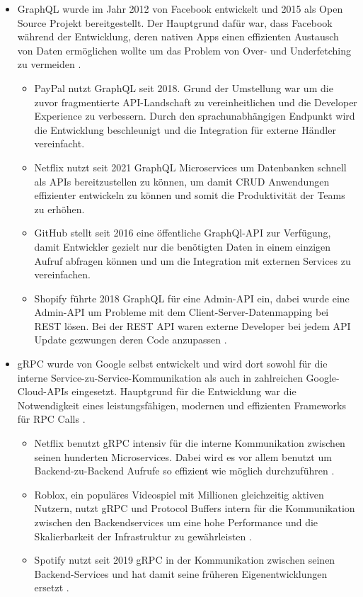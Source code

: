 \begin{itemize}
	\item GraphQL wurde im Jahr 2012 von Facebook entwickelt und 2015 als Open Source Projekt bereitgestellt. Der Hauptgrund dafür war, dass Facebook während der Entwicklung, deren nativen Apps einen effizienten Austausch von Daten ermöglichen wollte um das Problem von Over- und Underfetching zu vermeiden \parencite{graphql-org, aws-appsync-why-use-graphql}.
		\begin{itemize}
			\item PayPal nutzt GraphQL seit 2018. Grund der Umstellung war um die zuvor fragmentierte API-Landschaft zu vereinheitlichen und die Developer Experience zu verbessern. Durch den sprachunabhängigen Endpunkt wird die Entwicklung beschleunigt und die Integration für externe Händler vereinfacht. 
			\item Netflix nutzt seit 2021 GraphQL Microservices um Datenbanken schnell als APIs bereitzustellen zu können, um damit CRUD Anwendungen effizienter entwickeln zu können und somit die Produktivität der Teams zu erhöhen.
			\item GitHub stellt seit 2016 eine öffentliche GraphQl-API zur Verfügung, damit Entwickler gezielt nur die benötigten Daten in einem einzigen Aufruf abfragen können und um die Integration mit externen Services zu vereinfachen.
			\item Shopify führte 2018 GraphQL für eine Admin-API ein, dabei wurde eine Admin-API um Probleme mit dem Client-Server-Datenmapping bei REST lösen. Bei der REST API waren externe Developer bei jedem API Update gezwungen deren Code anzupassen \parencite{nordicapis-graphql-examples}.
		\end{itemize}
	\item gRPC wurde von Google selbst entwickelt und wird dort sowohl für die interne Service-zu-Service-Kommunikation als auch in zahlreichen Google-Cloud-APIs eingesetzt. Hauptgrund für die Entwicklung war die Notwendigkeit eines leistungsfähigen, modernen und effizienten Frameworks für RPC Calls \parencite{grpc-history}.
		\begin{itemize}
			\item Netflix benutzt gRPC intensiv für die interne Kommunikation zwischen seinen hunderten Microservices. Dabei wird es vor allem benutzt um Backend-zu-Backend Aufrufe so effizient wie möglich durchzuführen \parencite{netflix-protobuf}.
			\item Roblox, ein populäres Videospiel mit Millionen gleichzeitig aktiven Nutzern, nutzt gRPC und Protocol Buffers intern für die Kommunikation zwischen den Backendservices um eine hohe Performance und die Skalierbarkeit der Infrastruktur zu gewährleisten \parencite{roblox-analytics}.
			\item Spotify nutzt seit 2019 gRPC in der Kommunikation zwischen seinen Backend-Services und hat damit seine früheren Eigenentwicklungen ersetzt \parencite{spotify-k8s-case}.
		\end{itemize}
\end{itemize}


